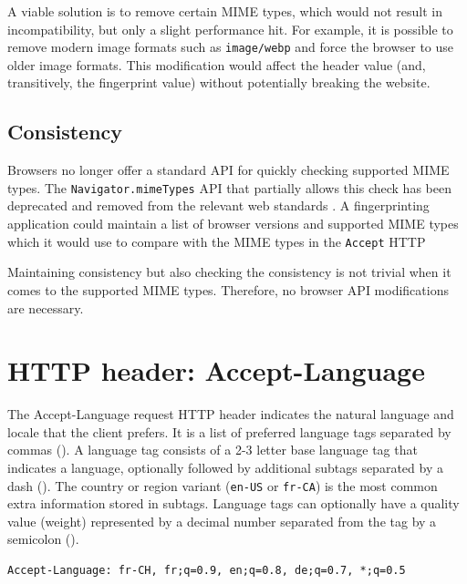 \medbreak

A viable solution is to remove certain MIME types, which would not result in incompatibility, but only a slight performance hit. For example, it is possible to remove modern image formats such as \texttt{image/webp} and force the browser to use older image formats. This modification would affect the header value (and, transitively, the fingerprint value) without potentially breaking the website.

\subsection{Consistency}

Browsers no longer offer a standard API for quickly checking supported MIME types. The \texttt{Navigator.mimeTypes} API that partially allows this check has been deprecated and removed from the relevant web standards \cite{MDNNavigatorInterface}. A fingerprinting application could maintain a list of browser versions and supported MIME types which it would use to compare with the MIME types in the \texttt{Accept} HTTP 

Maintaining consistency but also checking the consistency is not trivial when it comes to the supported MIME types. Therefore, no browser API modifications are necessary.

\section{HTTP header: Accept-Language}
\label{SectionHTTPHeaderAcceptLanguage}

The Accept-Language request HTTP header \cite{MDNHeaderAcceptLanguage} indicates the natural language and locale that the client prefers. It is a list of preferred language tags separated by commas (\uv{,}). A language tag consists of a 2-3 letter base language tag that indicates a language, optionally followed by additional subtags separated by a dash (\uv{-}). The country or region variant (\texttt{en-US} or \texttt{fr-CA}) is the most common extra information stored in subtags. Language tags can optionally have a quality value (weight) represented by a decimal number separated from the tag by a semicolon (\uv{;}).

\bigbreak

\begin{lstlisting}[caption={An example of Accept-Language header contents \cite{MDNHeaderAcceptLanguage}.}]
Accept-Language: fr-CH, fr;q=0.9, en;q=0.8, de;q=0.7, *;q=0.5
\end{lstlisting}

